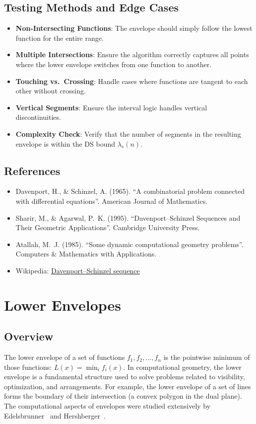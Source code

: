 \subsection{Testing Methods and Edge Cases}
\begin{itemize}
    \item \textbf{Non-Intersecting Functions}: The envelope should simply follow the lowest function for the entire range.
    \item \textbf{Multiple Intersections}: Ensure the algorithm correctly captures all points where the lower envelope switches from one function to another.
    \item \textbf{Touching vs.\ Crossing}: Handle cases where functions are tangent to each other without crossing.
    \item \textbf{Vertical Segments}: Ensure the interval logic handles vertical discontinuities.
    \item \textbf{Complexity Check}: Verify that the number of segments in the resulting envelope is within the DS bound $\lambda_s(n)$.
\end{itemize}

\subsection{References}
\begin{itemize}
    \item Davenport, H., \& Schinzel, A. (1965). ``A combinatorial problem connected with differential equations''. American Journal of Mathematics.
    \item Sharir, M., \& Agarwal, P.~K. (1995). ``Davenport--Schinzel Sequences and Their Geometric Applications''. Cambridge University Press.
    \item Atallah, M.~J. (1985). ``Some dynamic computational geometry problems''. Computers \& Mathematics with Applications.
    \item Wikipedia: \href{https://en.wikipedia.org/wiki/Davenport\%E2\%80\%93Schinzel_sequence}{Davenport--Schinzel sequence}
\end{itemize}

\section{Lower Envelopes}
\label{sec:lower_envelopes}

\subsection{Overview}
The lower envelope of a set of functions $f_1, f_2, \dots, f_n$ is the pointwise minimum of those functions: $L(x) = \min_i f_i(x)$. In computational geometry, the lower envelope is a fundamental structure used to solve problems related to visibility, optimization, and arrangements. For example, the lower envelope of a set of lines forms the boundary of their intersection (a convex polygon in the dual plane). The computational aspects of envelopes were studied extensively by Edelsbrunner~\cite{edelsbrunner1987} and Hershberger~\cite{hershberger1989}.

